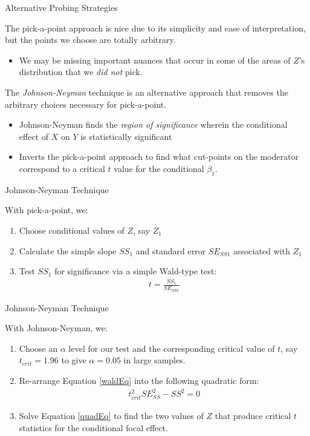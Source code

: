 \documentclass{beamer}
\newcommand{\va}[0]{\vspace{12pt}}
\newcommand{\vb}[0]{\vspace{6pt}}
\newcommand{\vc}[0]{\vspace{3pt}}
\begin{document}
\begin{frame}{Alternative Probing Strategies}
  
  The pick-a-point approach is nice due to its simplicity and ease of
  interpretation, but the points we choose are totally arbitrary.
  \vb
  \begin{itemize}
    \item We may be missing important nuances that occur in some of
      the areas of $Z$'s distribution that we \emph{did not} pick.
  \end{itemize}
  \va
  \pause
  The \emph{Johnson-Neyman} technique is an alternative approach that
  removes the arbitrary choices necessary for pick-a-point.
  \vb
  \begin{itemize}
    \item Johnson-Neyman finds the \emph{region of significance}
      wherein the conditional effect of $X$ on $Y$ is statistically
      significant
      \vb
    \item Inverts the pick-a-point approach to find what cut-points on
      the moderator correspond to a critical $t$ value for the
      conditional $\beta_1$.
  \end{itemize}

\end{frame}


\begin{frame}{Johnson-Neyman Technique}
  
  With pick-a-point, we:
  \vb
  \begin{enumerate}
    \item Choose conditional values of $Z$, say $Z_1$
      \vb
    \item Calculate the simple slope $SS_1$ and standard error
      $SE_{SS1}$ associated with $Z_1$
      \vb
    \item Test $SS_1$ for significance via a simple Wald-type test:
      \begin{align}
        t = \frac{SS_1}{SE_{SS1}} \label{waldEq}
      \end{align}
  \end{enumerate}

\end{frame}


\begin{frame}{Johnson-Neyman Technique}
  
  With Johnson-Neyman, we:
  \vb
  \begin{enumerate}
  \item Choose an $\alpha$ level for our test and the corresponding
    critical value of $t$, say $t_{crit} = 1.96$ to give $\alpha =
    0.05$ in large samples.
    \vb
  \item Re-arrange Equation \ref{waldEq} into the following quadratic
    form:
    \begin{align}
      t_{crit}^2 SE_{SS}^2 - SS^2 = 0 \label{quadEq}
    \end{align}
    \vc
  \item Solve Equation \ref{quadEq} to find the two values of $Z$ that
    produce critical $t$ statistics for the conditional focal effect.
  \end{enumerate}
  
\end{frame}
\end{document}
